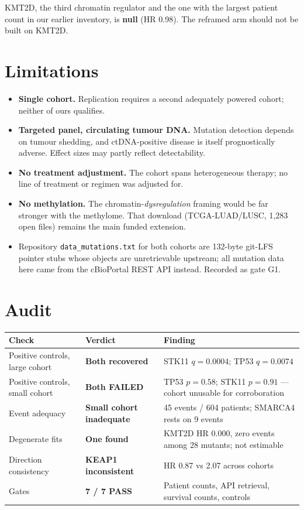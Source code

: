 \documentclass[11pt,a4paper]{article}
\begin{document}
KMT2D, the third chromatin regulator and the one with the largest patient count in our
earlier inventory, is \textbf{null} (HR 0.98). The reframed arm should not be built on KMT2D.

\section{Limitations}

\begin{itemize}[leftmargin=1.4em,nosep]
\item \textbf{Single cohort.} Replication requires a second adequately powered cohort;
neither of ours qualifies.
\item \textbf{Targeted panel, circulating tumour DNA.} Mutation detection depends on tumour
shedding, and ctDNA-positive disease is itself prognostically adverse. Effect sizes may
partly reflect detectability.
\item \textbf{No treatment adjustment.} The cohort spans heterogeneous therapy; no line of
treatment or regimen was adjusted for.
\item \textbf{No methylation.} The chromatin-\emph{dysregulation} framing would be far
stronger with the methylome. That download (TCGA-LUAD/LUSC, 1{,}283 open files) remains the
main funded extension.
\item Repository \texttt{data\_mutations.txt} for both cohorts are 132-byte git-LFS pointer
stubs whose objects are unretrievable upstream; all mutation data here came from the
cBioPortal REST API instead. Recorded as gate G1.
\end{itemize}

\section{Audit}

\begin{center}
\begin{tabular}{@{}llp{7.0cm}@{}}
\toprule
\textbf{Check} & \textbf{Verdict} & \textbf{Finding} \\
\midrule
Positive controls, large cohort & \textbf{Both recovered} & STK11 $q=0.0004$; TP53 $q=0.0074$ \\
Positive controls, small cohort & \textbf{Both FAILED} & TP53 $p=0.58$; STK11 $p=0.91$ --- cohort unusable for corroboration \\
Event adequacy & \textbf{Small cohort inadequate} & 45 events / 604 patients; SMARCA4 rests on 9 events \\
Degenerate fits & \textbf{One found} & KMT2D HR 0.000, zero events among 28 mutants; not estimable \\
Direction consistency & \textbf{KEAP1 inconsistent} & HR 0.87 vs 2.07 across cohorts \\
Gates & \textbf{7 / 7 PASS} & Patient counts, API retrieval, survival counts, controls \\
\bottomrule
\end{tabular}
\end{center}
\end{document}
